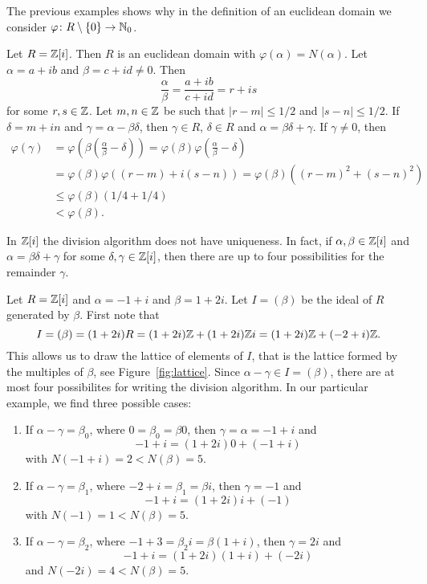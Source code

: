 The previous examples shows why in the definition of an euclidean domain 
we consider $\varphi\colon R\setminus\{0\}\to\mathbb{N}_0$. 

\begin{example}
	Let $R=\mathbb{Z}[i]$. Then $R$ is an euclidean domain with $\varphi(\alpha)=N(\alpha)$. Let 
	$\alpha=a+ib$ and $\beta=c+id\ne 0$. Then
	\[
	\frac{\alpha}{\beta}=\frac{a+ib}{c+id}=r+is
	\]
	for some $r,s\in\mathbb{Z}$. Let $m,n\in\mathbb{Z}$ be such that $|r-m|\leq 1/2$ and 
	$|s-n|\leq 1/2$. If $\delta=m+in$ and $\gamma=\alpha-\beta\delta$, then 
	$\gamma\in R$, $\delta\in R$ and $\alpha=\beta\delta+\gamma$. If $\gamma\ne0$, then
	\begin{align*}
	\varphi(\gamma)&=\varphi\left(\beta\left(\frac{\alpha}{\beta}-\delta\right)\right)
	=\varphi(\beta)\varphi\left(\frac{\alpha}{\beta}-\delta\right)\\
	&=\varphi(\beta)\varphi((r-m)+i(s-n))
	=\varphi(\beta)((r-m)^2+(s-n)^2)\\
	&\leq\varphi(\beta)(1/4+1/4)\\
	&<\varphi(\beta).
	\end{align*}	
\end{example}

In $\mathbb{Z}[i]$ the division algorithm does not have uniqueness. In fact, 
if $\alpha,\beta\in\mathbb{Z}[i]$ and $\alpha=\beta\delta+\gamma$ 
for some $\delta,\gamma\in\mathbb{Z}[i]$, 
then there are up to four possibilities 
for the remainder $\gamma$.


\begin{example}
	Let $R=\mathbb{Z}[i]$ and 
	$\alpha=-1+i$ and $\beta=1+2i$. Let $I=(\beta)$ be the ideal of $R$ generated by $\beta$. 
	First note that
	\[
	I=(\beta)=(1+2i)R=(1+2i)\mathbb{Z}+(1+2i)\mathbb{Z} i=(1+2i)\mathbb{Z}+(-2+i)\mathbb{Z}.
	\]  
	This allows us to draw the lattice of elements of $I$, 
	that is the lattice formed by the multiples of $\beta$, see Figure~\ref{fig:lattice}. 
	Since $\alpha-\gamma\in I=(\beta)$, there are at most four possibilites for writing
	the division algorithm. 
	In our particular example, we find three possible cases:
	\begin{enumerate}
		\item If $\alpha-\gamma=\beta_0$, where $0=\beta_0=\beta 0$, 
			then $\gamma=\alpha=-1+i$ and 
				\[
				-1+i=(1+2i)0+(-1+i)
				\]
				with $N(-1+i)=2<N(\beta)=5$. 
		\item If $\alpha-\gamma=\beta_1$, where $-2+i=\beta_1=\beta i$, then 
			$\gamma=-1$ and 
			\[
			-1+i=(1+2i)i+(-1)
			\]
			with $N(-1)=1<N(\beta)=5$. 
		\item If $\alpha-\gamma=\beta_2$, where $-1+3=\beta_2i=\beta (1+i)$, 
			then $\gamma=2i$ and  
			\[
			-1+i=(1+2i)(1+i)+(-2i)
			\]
			and $N(-2i)=4<N(\beta)=5$. 
	\end{enumerate}
\end{example}

